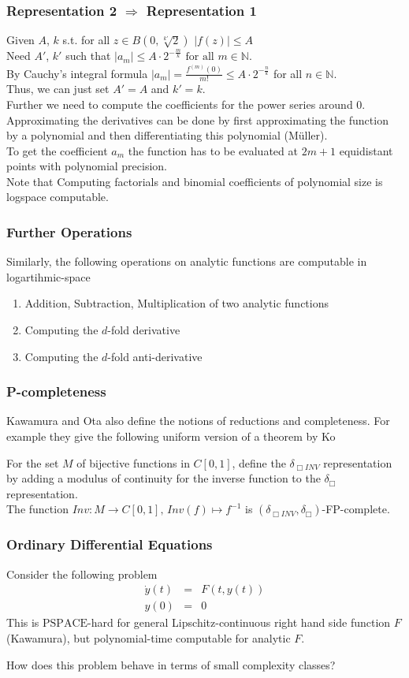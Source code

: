 \documentclass[xcolor=pdftex,dvipsnames,table]{beamer}
\newcommand{\N}{\ensuremath{\mathbb{N}}}
\newcommand{\abs}[1]{\left|#1\right|}
\newcommand{\pspace}{\ensuremath{\text{PSPACE}}\xspace}
\begin{document}
\begin{frame}
\frametitle{Representation 2 $\Rightarrow$ Representation 1}
Given $A$, $k$ s.t. for all $z \in B(0, \sqrt[k']{2})$
$\abs{f(z)} \leq A$\\
Need $A'$, $k'$ such that $\abs{a_m} \leq A \cdot 2^{-\frac{m}{k}} \text{ for all } m \in \N.$\\
By Cauchy's integral formula $\abs{a_m} = \frac{f^{(m)}(0)}{m!} \leq A \cdot 2^{-\frac{n}{k}}$ for all $n \in \N$. \\
Thus, we can just set $A' = A$ and $k' = k$.\\
\pause
Further we need to compute the coefficients for the power series around $0$.\\
Approximating the derivatives can be done by first approximating the function by a polynomial and then differentiating this polynomial (M\"{u}ller).\\
To get the coefficient $a_m$  the function has to be evaluated at $2m+1$ equidistant points with polynomial precision.\\
Note that Computing factorials and binomial coefficients of polynomial size is logspace computable.\\
\end{frame}
\begin{frame}
\frametitle{Further Operations}
  Similarly, the following operations on analytic functions are computable in logartihmic-space
  \begin{enumerate}
    \item Addition, Subtraction, Multiplication of two analytic functions
    \item Computing the $d$-fold derivative
    \item Computing the $d$-fold anti-derivative
   \end{enumerate}
\end{frame}
\begin{frame}
  \frametitle{P-completeness}
  Kawamura and Ota also define the notions of reductions and completeness.
  For example they give the following uniform version of a theorem by Ko
  \begin{theorem}
    For the set $M$ of bijective functions in $C[0,1]$, define the $\delta_{\Box INV}$ representation by adding a modulus of continuity for the inverse function to the $\delta_{\Box}$ representation.\\
    The function $Inv: M \to C[0,1],\, Inv(f) \mapsto f^{-1}$ is $(\delta_{\Box INV}, \delta_{\Box})$-FP-complete.
  \end{theorem}
\end{frame}
\begin{frame}
  \frametitle{Ordinary Differential Equations}
  Consider the following problem
\begin{eqnarray*}
  \dot y(t) &=& F(t, y(t)) \\
  y(0) &=& 0 
\end{eqnarray*}
This is \pspace-hard for general Lipschitz-continuous right hand side function $F$ (Kawamura),
but polynomial-time computable for analytic $F$.

How does this problem behave in terms of small complexity classes?
 \end{frame}
\end{document}
